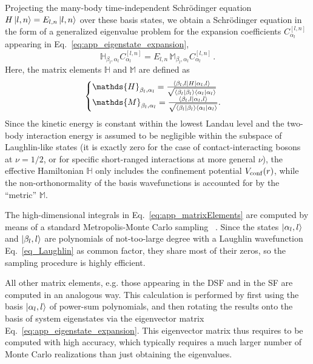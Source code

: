 \documentclass[twocolumn,pra,superscriptaddress,noshowpacs]{revtex4}
\begin{document}
Projecting the many-body time-independent Schr\"odinger equation $H\ket{l,n}=E_{l,n}\ket{l,n}$ over these basis states, we obtain a Schr\"odinger equation in the form of a generalized eigenvalue problem for the expansion coefficients $C_{\alpha_l}^{[l,n]}$ appearing in Eq.~\eqref{eq:app_eigenstate_expansion},
\begin{equation}
    \label{eq:app_projectedSchrodinger}
        \mathds{H}_{\beta_l,\alpha_l}C_{\alpha_l}^{[l,n]}
        =
        E_{l,n}\,\mathds{M}_{\beta_l,\alpha_l} C_{\alpha_l}^{[l,n]}\,.
\end{equation}
Here, the matrix elements $\mathds{H}$ and $\mathds{M}$ are defined as
\begin{equation}
    \label{eq:app_matrixElements}
    \begin{cases}
        \mathds{H}_{\beta_l,\alpha_l} = \frac{\bra{\beta_l,l}H\ket{\alpha_l,l}}{\sqrt{\braket{\beta_l|\beta_l}\braket{\alpha_l|\alpha_l}}}
        \\
        \mathds{M}_{\beta_l,\alpha_l} = \frac{\braket{\beta_l,l|\alpha_l,l}}{\sqrt{\braket{\beta_l|\beta_l}\braket{\alpha_l|\alpha_l}}}.
    \end{cases}
\end{equation}
Since the kinetic energy is constant within the lowest Landau level and the two-body interaction energy is assumed to be negligible within the subspace of Laughlin-like states (it is exactly zero for the case of contact-interacting bosons at $\nu=1/2$, or for specific short-ranged interactions at more general $\nu$), the effective Hamiltonian $\mathds{H}$ only includes the confinement potential $V_{\rm conf}(r)$, while the non-orthonormality of the basis wavefunctions is accounted for by the ``metric'' $\mathds{M}$.

The high-dimensional integrals in Eq.~\eqref{eq:app_matrixElements} are computed by means of a standard Metropolis-Monte Carlo sampling ~\cite{MetropolisUlam_JStat_1949,MetropolisTeller_JChemPhys_1953,Hastings_Biometrika_1970}. Since the states $\ket{\alpha_l,l}$ and $\ket{\beta_l,l}$ are polynomials of not-too-large degree with a Laughlin wavefunction Eq.~\eqref{eq_Laughlin} as common factor, they share most of their zeros, so the sampling procedure is highly efficient.

All other matrix elements, e.g. those appearing in the DSF and in the SF  are computed in an analogous way. This calculation is performed by first using the  basis $\ket{\alpha_l,l}$ of power-sum polynomials, and then rotating the results onto the basis of system eigenstates via the eigenvector matrix Eq.~\eqref{eq:app_eigenstate_expansion}. This eigenvector matrix thus requires to be computed with high accuracy, which typically requires a much larger number of Monte Carlo realizations than just obtaining the eigenvalues.
\end{document}
